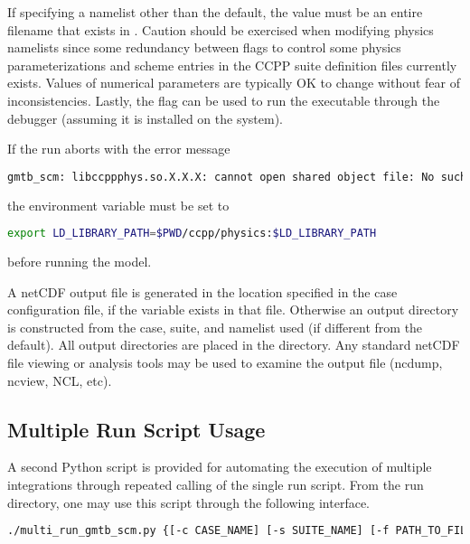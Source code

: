 If specifying a namelist other than the default, the value must be an entire filename that exists in . Caution should be exercised when modifying physics namelists since some redundancy between flags to control some physics parameterizations and scheme entries in the CCPP suite definition files currently exists. Values of numerical parameters are typically OK to change without fear of inconsistencies. Lastly, the  flag can be used to run the executable through the  debugger (assuming it is installed on the system).

If the run aborts with the error message
\begin{lstlisting}[language=bash]
gmtb_scm: libccppphys.so.X.X.X: cannot open shared object file: No such file or directory
\end{lstlisting}
the environment variable  must be set to
\begin{lstlisting}[language=bash]
export LD_LIBRARY_PATH=$PWD/ccpp/physics:$LD_LIBRARY_PATH
\end{lstlisting}
before running the model.

A netCDF output file is generated in the location specified in the case
configuration file, if the  variable exists in that file. Otherwise an output directory is constructed from the case, suite, and namelist used (if different from the default). All output directories are placed in the  directory. Any standard netCDF file viewing or analysis tools may be used to
examine the output file (ncdump, ncview, NCL, etc).

\subsection{Multiple Run Script Usage}

A second Python script is provided for automating the execution of multiple integrations through repeated calling of the single run script. From the run directory, one may use this script through the following interface.

\begin{lstlisting}[language=bash]
./multi_run_gmtb_scm.py {[-c CASE_NAME] [-s SUITE_NAME] [-f PATH_TO_FILE]} [-v{v}] [-t]
\end{lstlisting}

